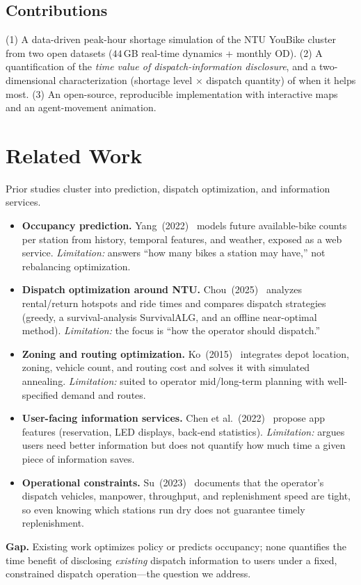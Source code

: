 \documentclass[11pt,a4paper]{article}
\begin{document}
\subsection{Contributions}
(1) A data-driven peak-hour shortage simulation of the NTU YouBike cluster from two open datasets ($44$\,GB real-time dynamics +
monthly OD). (2) A quantification of the \emph{time value of dispatch-information disclosure}, and a two-dimensional
characterization (shortage level $\times$ dispatch quantity) of when it helps most. (3) An open-source, reproducible
implementation with interactive maps and an agent-movement animation.

\section{Related Work}
Prior studies cluster into prediction, dispatch optimization, and information services.
\begin{itemize}
\item \textbf{Occupancy prediction.} Yang~(2022)~\cite{yang2022} models future available-bike counts per station from history,
temporal features, and weather, exposed as a web service. \emph{Limitation:} answers ``how many bikes a station may have,'' not
rebalancing optimization.
\item \textbf{Dispatch optimization around NTU.} Chou~(2025)~\cite{chou2025} analyzes rental/return hotspots and ride times and
compares dispatch strategies (greedy, a survival-analysis SurvivalALG, and an offline near-optimal method). \emph{Limitation:}
the focus is ``how the operator should dispatch.''
\item \textbf{Zoning and routing optimization.} Ko~(2015)~\cite{ko2015} integrates depot location, zoning, vehicle count, and
routing cost and solves it with simulated annealing. \emph{Limitation:} suited to operator mid/long-term planning with
well-specified demand and routes.
\item \textbf{User-facing information services.} Chen et al.~(2022)~\cite{chen2022} propose app features (reservation, LED
displays, back-end statistics). \emph{Limitation:} argues users need better information but does not quantify how much time a
given piece of information saves.
\item \textbf{Operational constraints.} Su~(2023)~\cite{su2023} documents that the operator's dispatch vehicles, manpower,
throughput, and replenishment speed are tight, so even knowing which stations run dry does not guarantee timely replenishment.
\end{itemize}
\textbf{Gap.} Existing work optimizes policy or predicts occupancy; none quantifies the time benefit of disclosing \emph{existing}
dispatch information to users under a fixed, constrained dispatch operation---the question we address.
\end{document}
